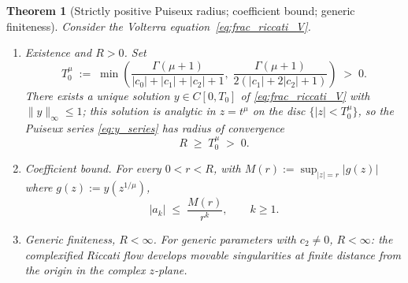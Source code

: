 \documentclass[11pt,a4paper]{article}
\newtheorem{theorem}{Theorem}[section]
\begin{document}
\begin{theorem}[Strictly positive Puiseux radius; coefficient bound; generic finiteness]\label{thm:radius}
Consider the Volterra equation~\eqref{eq:frac_riccati_V}.
\begin{enumerate}[label=(\roman*),leftmargin=2.2em,nosep]
\item \emph{Existence and \(R>0\).} Set
\begin{equation}\label{eq:T0_choice}
T_0^\mu \;:=\; \min\!\left(\frac{\Gamma(\mu+1)}{|c_0|+|c_1|+|c_2|+1},\;\frac{\Gamma(\mu+1)}{2(|c_1|+2|c_2|+1)}\right) \;>\;0.
\end{equation}
There exists a unique solution \(y\in C[0,T_0]\) of \eqref{eq:frac_riccati_V} with \(\|y\|_\infty\le1\); this solution is analytic in \(z=t^\mu\) on the disc \(\{|z|<T_0^\mu\}\), so the Puiseux series \eqref{eq:y_series} has radius of convergence
\[
R\;\ge\;T_0^\mu\;>\;0.
\]
\item \emph{Coefficient bound.} For every \(0<r<R\), with \(M(r):=\sup_{|z|=r}|g(z)|\) where \(g(z):=y(z^{1/\mu})\),
\begin{equation}\label{eq:cauchy_bound}
|a_k|\;\le\;\frac{M(r)}{r^k},\qquad k\ge1.
\end{equation}
\item \emph{Generic finiteness, \(R<\infty\).} For generic parameters with \(c_2\ne0\), \(R<\infty\): the complexified Riccati flow develops movable singularities at finite distance from the origin in the complex \(z\)-plane.
\end{enumerate}
\end{theorem}
\end{document}
